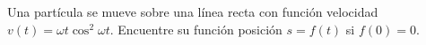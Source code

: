\item Una partícula se mueve sobre una línea recta con función velocidad $v(t) = \omega t \cos^2 \omega t$. Encuentre su función posición $s = f(t)$ si $f(0) = 0$.
